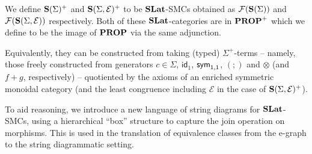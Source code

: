 \begin{definition}
We define $\mathbf{S}(\Sigma)^{+}$ and $\mathbf{S}(\Sigma, \mathcal{E})^{+}$ to be $\mathbf{SLat}$-SMCs obtained as $\mathcal{F}(\mathbf{S}(\Sigma))$ and $\mathcal{F}(\mathbf{S}(\Sigma, \mathcal{E}))$ respectively.
Both of these $\mathbf{SLat}$-categories are in $\mathbf{PROP}^{+}$ which we define to be the image of $\mathbf{PROP}$ via the same adjunction.
\end{definition}
Equivalently, they can be constructed from taking (typed) $\Sigma^+$-terms  -- namely, those freely constructed from generators $c \in \Sigma$, $\textsf{id}_1$, $\textsf{sym}_{1,1}$, $(;\!)$ and $\otimes$ (and $f+g$, respectively) -- quotiented by the axioms of an enriched symmetric monoidal category (and the least congruence including $\mathcal{E}$ in the case of $\mathbf{S}(\Sigma, \mathcal{E})^{+}$).

To aid reasoning, we introduce a new language of string diagrams for $\mathbf{SLat}$-SMCs, using a hierarchical ``box'' structure to capture the join operation on morphisms.  This is  used in the translation of equivalence classes from the e-graph to the string diagrammatic setting. 

